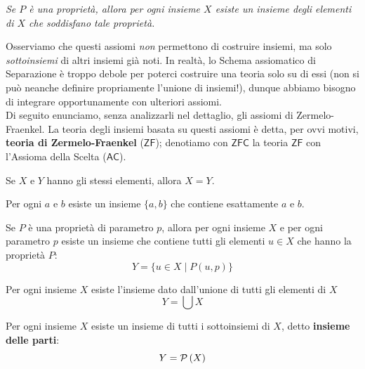 \begin{center}
	\emph{Se $P$ è una proprietà, allora per ogni insieme $X$ esiste un insieme degli elementi di $X$ che soddisfano tale proprietà.}
\end{center}
Osserviamo che questi assiomi \textit{non} permettono di costruire insiemi, ma solo \textit{sottoinsiemi} di altri insiemi già noti. In realtà, lo Schema assiomatico di Separazione è troppo debole per poterci costruire una teoria solo su di essi (non si può neanche definire propriamente l'unione di insiemi!), dunque abbiamo bisogno di integrare opportunamente con ulteriori assiomi.\\
Di seguito enunciamo, senza analizzarli nel dettaglio, gli assiomi di Zermelo-Fraenkel. La teoria degli insiemi basata su questi assiomi è detta, per ovvi motivi, \textbf{teoria di Zermelo-Fraenkel} ($\mathsf{ZF}$); denotiamo con $\mathsf{ZFC}$ la teoria $\mathsf{ZF}$ con l'Assioma della Scelta ($\mathsf{AC}$).
\begin{axiom}
	 Se $X$ e $Y$ hanno gli stessi elementi, allora $X=Y$.
\end{axiom}
\begin{axiom}
	Per ogni $a$ e $b$ esiste un insieme $\{a,b\}$ che contiene esattamente $a$ e $b$.
\end{axiom}
\begin{axiom}
	Se $P$ è una proprietà di parametro $p$, allora per ogni insieme $X$ e per ogni parametro $p$ esiste un insieme che contiene tutti gli elementi $u\in X$ che hanno la proprietà $P$:
	\begin{equation*}
		Y=\{u\in X\mid P\left(u,p\right)\}
	\end{equation*}
\end{axiom}
\begin{axiom}
	Per ogni insieme $X$ esiste l'insieme dato dall'unione di tutti gli elementi di $X$
	\begin{equation*}
		Y=\bigcup X
	\end{equation*}
\end{axiom}
\begin{axiom}
	Per ogni insieme $X$ esiste un insieme di tutti i sottoinsiemi di $X$, detto \textbf{insieme delle parti}:
	\begin{equation*}
		Y=\mathcal{P}\left(X\right)
	\end{equation*}
\end{axiom}
